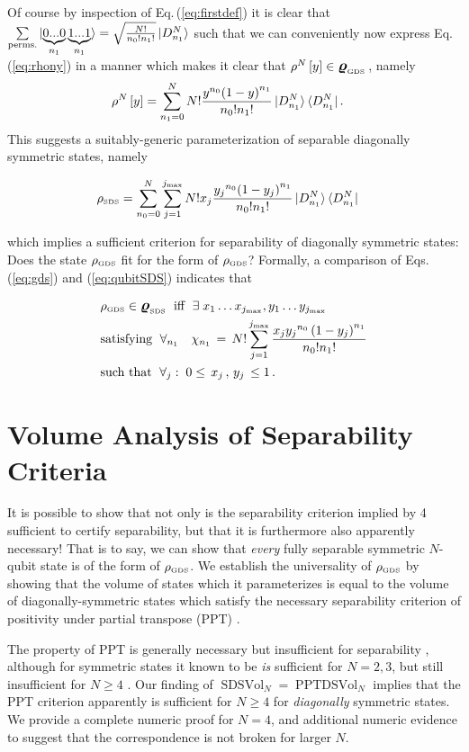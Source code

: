 \documentclass[
  12pt          %
  ,letterpaper  %
  ,center       %
  ,noupper      %
  ,english,fleqn]{uconnthesis}
\let\stdsection\section
\renewcommand\section{\newpage\stdsection}
\newcommand{\LeftEqns}[1]{\begin{fleqn}[\leftmargini minus \leftmargini]\begin{align}#1\end{align}\end{fleqn}}
\newcommand{\LeftEqn}[1]{\LeftEqns{\begin{split}#1\end{split}}}
\newcommand{\ceq}[1]{Eq.\,(\ref{#1})}
\newcommand{\brho}[0]{\bm{\mbox{\large \(\varrho\)}}}
\begin{document}
Of course by inspection of \ceq{eq:firstdef} it is clear that $\sum\limits_{\text{perms.}}{\ket{\underbrace{0...0}_{n_1}\underbrace{1...1}_{n_1}}}=\sqrt{\frac{N!}{n_0! n_1!}}\ket{D^N_{n_1}}$ such that we can conveniently now express \ceq{eq:rhony} in a manner which makes it clear that $\rho^N\left[y\right] \in \brho_{\text{\tiny GDS}}\,$, namely
\begin{align}\label{eq:rhosdsy}
\rho^N\left[y\right]&= \sum\limits_{n_1=0}^{N}{N!\frac{{y}^{n_0}{(1-y)}^{n_1}}{n_0! n_1!}\ket{D^N_{n_1}}\bra{D^N_{n_1}}}\,.
\end{align}
This suggests a suitably-generic parameterization of separable diagonally symmetric states, namely
\LeftEqns{\label{eq:qubitSDS}
\rho_{\text{\tiny SDS}}&= \sum\limits_{n_0=0}^{N}{\sum\limits_{j=1}^{j_\text{max}}{N!x_j\frac{{y_j}^{n_0}{(1-y_j)}^{n_1}}{n_0! n_1!}\ket{D^N_{n_1}}\bra{D^N_{n_1}}}}
}
which implies a sufficient criterion for separability of diagonally symmetric states: Does the state $\rho_{\text{\tiny GDS}}$ fit for the form of $\rho_{\text{\tiny GDS}}$? Formally, a comparison of Eqs. (\ref{eq:gds}) and (\ref{eq:qubitSDS}) indicates that 
\LeftEqn{\label{eq:sepcrit}
&\rho_{\text{\tiny GDS}}\in\brho_{\text{\tiny SDS}}\;\text{ iff }\;\exists\;{x_1\dots x_{j_\text{max}}, y_1 \dots y_{j_\text{max}}}\\
 &\text{satisfying }\;\forall_{n_1} \quad {\chi_{n_1}} \,=\, N!\sum_{j=1}^{j_{\text{max}}}{\frac{x_j {y_j}^{n_0}\left(1-{y_j}\right)^{n_1}}{n_0!n_1!}}
    \\&\text{such that }\;\forall_{j}:\; 0\le \,x_j\,,\,y_j\,\le 1\,.
}

\section{Volume Analysis of Separability Criteria}

It is possible to show that not only is the separability criterion implied by 4 sufficient to certify separability, but that it is furthermore also apparently necessary! That is to say, we can show that {\em every} fully separable symmetric $N$-qubit state is of the form of $\rho_{\text{\tiny GDS}}$. We establish the universality of $\rho_{\text{\tiny GDS}}$ by showing that the volume of states which it parameterizes is equal to the volume of diagonally-symmetric states which satisfy the necessary separability criterion of positivity under partial transpose (PPT) \cite{PPTAsher,PPTHorodecki}.

The property of PPT is generally necessary but insufficient for separability \cite{UPBOriginal,acin2001bound,Szalay2012Partial,PPTNonlocal}, although for symmetric states it known to be {\em is} sufficient for $N=2,3$, but still insufficient for $N\geq 4$ \cite{eckert2002quantum,ppt4qubit,pptNqubit,ConvVsNeg}. Our finding of $\operatorname{SDSVol}_{N}=\operatorname{PPTDSVol}_{N}$ implies that the PPT criterion apparently {\em} is sufficient for $N\geq 4$ for {\em diagonally} symmetric states. We provide a complete numeric proof for $N=4$, and additional numeric evidence to suggest that the correspondence is not broken for larger $N$.
\end{document}
